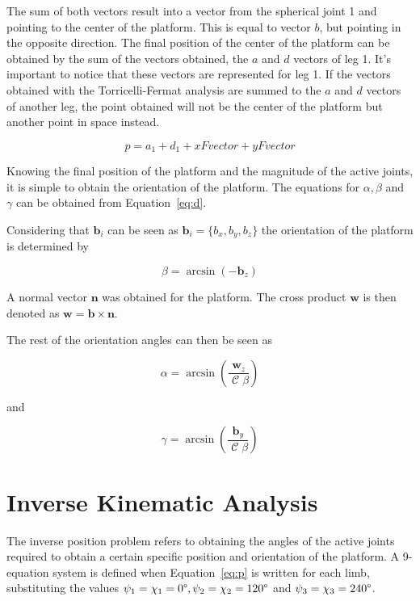 \documentclass[titlepage, letterpaper]{article}
\DeclareMathOperator{\cose}{\mathcal{C}}
\begin{document}
The sum of both vectors result into a vector from the spherical joint 1 and pointing to the center of the platform.
This is equal to vector $b$, but pointing in the opposite direction.
The final position of the center of the platform can be obtained by the sum of the vectors obtained, the $a$ and $d$ vectors of leg 1.
It's important to notice that these vectors are represented for leg 1.
If the vectors obtained with the Torricelli-Fermat analysis are summed
to the $a$ and $d$ vectors of another leg, the point obtained will not be the center of the platform but another point in space instead.

\begin{equation}
    \label{eq:p_Fermat}
    p = a_1 + d_1 + xFvector + yFvector
\end{equation}

Knowing the final position of the platform and the magnitude of the active joints, it is simple to obtain the orientation of the platform.
The equations for $\alpha, \beta$ and $\gamma$ can be obtained from Equation~\ref{eq:d}.

Considering that $\mathbf{b}_i$ can be seen as $\mathbf{b}_i =\{b_x, b_y, b_z\}$ the orientation of the platform is determined by

\begin{equation}
    \label{eq:beta}
    \beta = \arcsin \left( -\mathbf{b}_z \right)
\end{equation}

A normal vector $\mathbf{n}$ was obtained for the platform. The cross product $\mathbf{w}$ is then denoted as $\mathbf{w} = \mathbf{b} \times \mathbf{n}$.

The rest of the orientation angles can then be seen as

\begin{equation}
    \label{eq:alpha}
    \alpha = \arcsin \left(\frac{\mathbf{w}_z}{\cose \beta} \right)
\end{equation}

and

\begin{equation}
    \label{eq:gamma}
    \gamma = \arcsin \left( \frac{\mathbf{b}_y}{\cose \beta} \right)
\end{equation}

\section{Inverse Kinematic Analysis}
\label{sec:inverse}

The inverse position problem refers to obtaining the angles of the active joints required to obtain a certain specific position and orientation of the platform.
A 9-equation system is defined when Equation~\ref{eq:p} is written for each limb, substituting the values $\psi_1 = \chi_1 = 0\degree, \psi_2 = \chi_2 = 120\degree$ and $\psi_3 = \chi_3 = 240\degree$.
\end{document}
